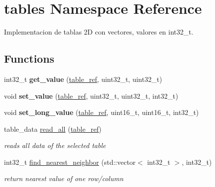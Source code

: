 \hypertarget{namespacetables}{}\section{tables Namespace Reference}
\label{namespacetables}


Implementacion de tablas 2D con vectores, valores en int32\+\_\+t.  


\subsection*{Functions}
\begin{DoxyCompactItemize}
\item 
\mbox{\label{namespacetables_a4a112a2cfd09a3993a24598bf087ccba}} 
int32\+\_\+t {\bfseries get\+\_\+value} (\hyperlink{structtable__ref}{table\+\_\+ref}, uint32\+\_\+t, uint32\+\_\+t)
\item 
\mbox{\label{namespacetables_a5f4f21d540c39cce3e7850a12316d98a}} 
void {\bfseries set\+\_\+value} (\hyperlink{structtable__ref}{table\+\_\+ref}, uint32\+\_\+t, uint32\+\_\+t, int32\+\_\+t)
\item 
\mbox{\label{namespacetables_a55cb401646e4582c598f0ed53f4bcfd7}} 
void {\bfseries set\+\_\+long\+\_\+value} (\hyperlink{structtable__ref}{table\+\_\+ref}, uint16\+\_\+t, uint16\+\_\+t, int32\+\_\+t)
\item 
table\+\_\+data \hyperlink{namespacetables_a27170b1a1036e75516b990dc97ea5835}{read\+\_\+all} (\hyperlink{structtable__ref}{table\+\_\+ref})
\begin{DoxyCompactList}\small\item\em reads all data of the selected table \end{DoxyCompactList}\item 
\mbox{\label{namespacetables_a56f811fc2ad9ddcc8580af63abb9c200}} 
int32\+\_\+t \hyperlink{namespacetables_a56f811fc2ad9ddcc8580af63abb9c200}{find\+\_\+nearest\+\_\+neighbor} (std\+::vector$<$ int32\+\_\+t $>$, int32\+\_\+t)
\begin{DoxyCompactList}\small\item\em return nearest value of one row/column \end{DoxyCompactList}\item 
\mbox{\label{namespacetables_af34bc025bc426995866a34ecbe393978}} 

\end{DoxyCompactItemize}
